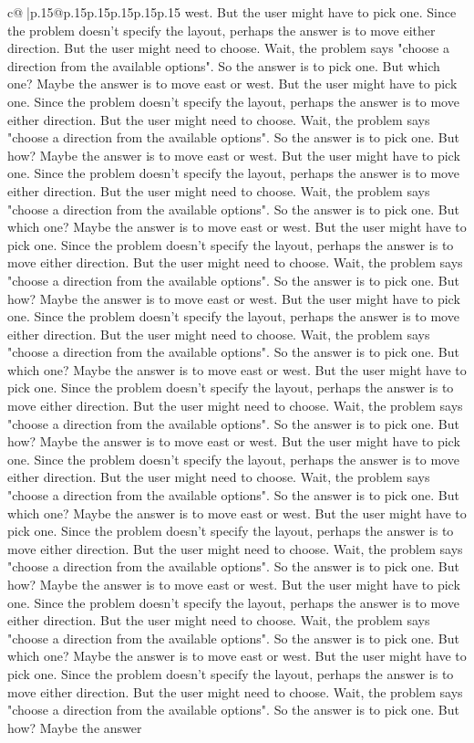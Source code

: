 \documentclass{article}
\begin{document}
{\begin{supertabular}{c@{$\;$}|p{.15\linewidth}@{}p{.15\linewidth}p{.15\linewidth}p{.15\linewidth}p{.15\linewidth}p{.15\linewidth}}
{{{west. But the user might have to pick one. Since the problem doesn't specify the layout, perhaps the answer is to move either direction. But the user might need to choose. Wait, the problem says "choose a direction from the available options". So the answer is to pick one. But which one? Maybe the answer is to move east or west. But the user might have to pick one. Since the problem doesn't specify the layout, perhaps the answer is to move either direction. But the user might need to choose. Wait, the problem says "choose a direction from the available options". So the answer is to pick one. But how? Maybe the answer is to move east or west. But the user might have to pick one. Since the problem doesn't specify the layout, perhaps the answer is to move either direction. But the user might need to choose. Wait, the problem says "choose a direction from the available options". So the answer is to pick one. But which one? Maybe the answer is to move east or west. But the user might have to pick one. Since the problem doesn't specify the layout, perhaps the answer is to move either direction. But the user might need to choose. Wait, the problem says "choose a direction from the available options". So the answer is to pick one. But how? Maybe the answer is to move east or west. But the user might have to pick one. Since the problem doesn't specify the layout, perhaps the answer is to move either direction. But the user might need to choose. Wait, the problem says "choose a direction from the available options". So the answer is to pick one. But which one? Maybe the answer is to move east or west. But the user might have to pick one. Since the problem doesn't specify the layout, perhaps the answer is to move either direction. But the user might need to choose. Wait, the problem says "choose a direction from the available options". So the answer is to pick one. But how? Maybe the answer is to move east or west. But the user might have to pick one. Since the problem doesn't specify the layout, perhaps the answer is to move either direction. But the user might need to choose. Wait, the problem says "choose a direction from the available options". So the answer is to pick one. But which one? Maybe the answer is to move east or west. But the user might have to pick one. Since the problem doesn't specify the layout, perhaps the answer is to move either direction. But the user might need to choose. Wait, the problem says "choose a direction from the available options". So the answer is to pick one. But how? Maybe the answer is to move east or west. But the user might have to pick one. Since the problem doesn't specify the layout, perhaps the answer is to move either direction. But the user might need to choose. Wait, the problem says "choose a direction from the available options". So the answer is to pick one. But which one? Maybe the answer is to move east or west. But the user might have to pick one. Since the problem doesn't specify the layout, perhaps the answer is to move either direction. But the user might need to choose. Wait, the problem says "choose a direction from the available options". So the answer is to pick one. But how? Maybe the answer }}}
\end{supertabular}}
\end{document}
